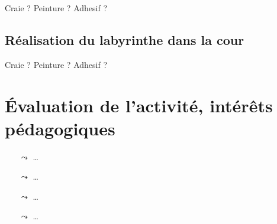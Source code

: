 Craie ? Peinture ? Adhesif ? 

\subsection{Réalisation du labyrinthe dans la cour}
Craie ? Peinture ? Adhesif ? 

\section{Évaluation de l'activité, intérêts pédagogiques}
\begin{itemize}
    \item[$\leadsto$] \dots
    \item[$\leadsto$] \dots
    \item[$\leadsto$] \dots    
    \item[$\leadsto$] \dots
\end{itemize}
